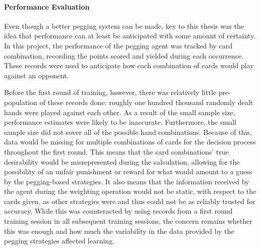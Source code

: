 \paragraph*{Performance Evaluation}

Even though a better pegging system can be made,
key to this thesis was the idea that performance can at least be
anticipated with some amount of certainty.
%
In this project,
the performance of the pegging agent was tracked by card combination,
recording the points scored and yielded during each occurrence.
%
These records were used to anticipate how each combination of cards would
play against an opponent.

Before the first round of training,
however,
there was relatively little pre-population of these records done:
roughly one hundred thousand randomly dealt hands were played against each
other.
%
As a result of the small sample size,
performance estimates were likely to be inaccurate.
%
Furthermore,
the small sample size did not cover all of the possible hand
combinations.
%
Because of this,
data would be missing for multiple combinations of cards
for the decision process
throughout the first round.
%
This means that the card combinations' true desirability would be
misrepresented during the calculation,
allowing for the possibility of an unfair
punishment or reward for what would amount to a guess by the
pegging-based strategies.
%
It also means that the information received by the agent during the weighting
operation would not be static, with respect to the cards given,
as other strategies were and thus could not be as
reliably trusted for accuracy.
%
While
this was counteracted by using records from a first round training session in 
all subsequent training sessions,
the concern remains whether this was enough
and how much the variability in the data provided by the pegging strategies
affected learning.

